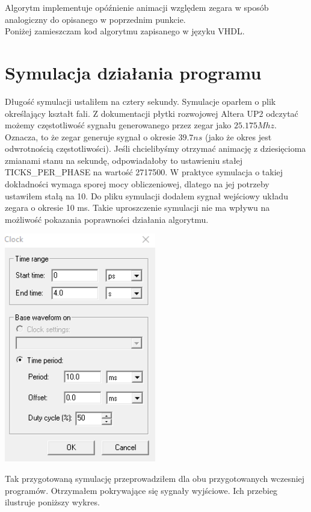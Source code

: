 \documentclass{article}
\begin{document}
        Algorytm implementuje opóźnienie animacji względem zegara w sposób analogiczny do opisanego w poprzednim punkcie.\\ 
    
        Poniżej zamieszczam kod algorytmu zapisanego w języku VHDL. 
        
    
    \section{Symulacja działania programu}
        Długość symulacji ustaliłem na cztery sekundy. Symulacje oparłem o plik określający kształt fali. Z dokumentacji płytki rozwojowej Altera UP2 odczytać możemy częstotliwość sygnału generowanego przez zegar jako $25.175Mhz$. Oznacza, to że zegar generuje sygnał o okresie $39.7ns$ (jako że okres jest odwrotnością częstotliwości). Jeśli chcielibyśmy otrzymać animację z dziesięcioma zmianami stanu na sekundę, odpowiadałoby to ustawieniu stałej TICKS\_PER\_PHASE na wartość 2717500. W praktyce symulacja o takiej dokładności wymaga sporej mocy obliczeniowej, dlatego na jej potrzeby ustawiłem stałą na 10. Do pliku symulacji dodałem sygnał wejściowy układu zegara o okresie 10 ms. Takie uproszczenie symulacji nie ma wpływu na możliwość pokazania poprawności działania algorytmu. 
        \begin{center}
            \includegraphics[height=10cm]{reports/img/fpga_clock.png}\\
        \end{center}
        \FloatBarrier
        Tak przygotowaną symulację przeprowadziłem dla obu przygotowanych wczesniej programów. Otrzymałem pokrywające się sygnały wyjściowe. Ich przebieg ilustruje poniższy wykres.
\end{document}
